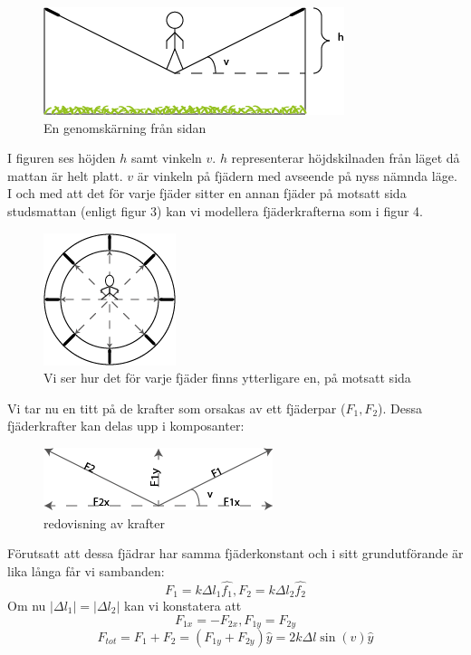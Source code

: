 \documentclass[10pt,a4paper]{article}
\begin{document}
\begin{figure}[ht]
\begin{center}
\includegraphics[scale=0.8]{fransidan}
\caption{En genomskärning från sidan}
\end{center}
\end{figure}
I figuren ses höjden $h$ samt vinkeln $v$. $h$ representerar höjdskilnaden från läget då mattan är helt platt. $v$ är vinkeln på fjädern med avseende på nyss nämnda läge.
I och med att det för varje fjäder sitter en annan fjäder på motsatt sida studsmattan (enligt figur 3) kan vi modellera fjäderkrafterna som i figur 4.
\begin{figure}[ht]
\begin{center}
\includegraphics[scale=1]{ovanifran}
\caption{Vi ser hur det för varje fjäder finns ytterligare en, på motsatt sida}
\end{center}
\end{figure}

Vi tar nu en titt på de krafter som orsakas av ett fjäderpar ($F_1,F_2$). Dessa fjäderkrafter kan delas upp i komposanter:
\begin{figure}[ht]
\begin{center}
\includegraphics[scale=1]{krafter}
\caption{redovisning av krafter}
\end{center}
\end{figure}

Förutsatt att dessa fjädrar har samma fjäderkonstant och i sitt grundutförande är lika långa får vi sambanden:
$$F_1=k\Delta l_1\hat{f_1}, F_2=k\Delta l_2\hat{f_2}$$
Om nu $|\Delta l_1|=|\Delta l_2|$ kan vi konstatera att
$$F_{1x}=-F_{2x}, F_{1y}=F_{2y}$$
$$F_{tot}=F_1+F_2=(F_{1y}+F_{2y})\hat{y}=2k\Delta l\sin(v)\hat{y}$$
\end{document}
